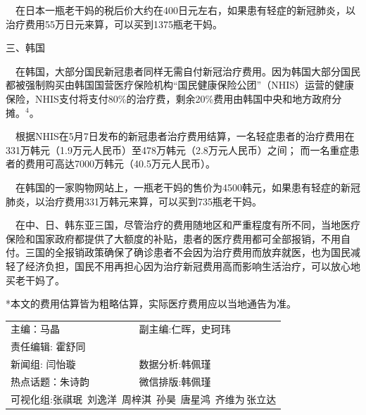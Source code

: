 \documentclass[
]{article}
\begin{document}
\(\quad\)在日本一瓶老干妈的税后价大约在400日元左右，如果患有轻症的新冠肺炎，以治疗费用55万日元来算，可以买到1375瓶老干妈。

三、韩国

\(\quad\)在韩国，大部分国民新冠患者同样无需自付新冠治疗费用。因为韩国大部分国民都被强制购买由韩国国营医疗保险机构``国民健康保险公团''（NHIS）运营的健康保险，NHIS支付将支付80\%的治疗费，剩余20\%费用由韩国中央和地方政府分摊。\(^4\)。

\(\quad\)根据NHIS在5月7日发布的新冠患者治疗费用结算，一名轻症患者的治疗费用在331万韩元（1.9万元人民币）至478万韩元（2.8万元人民币）之间；
而一名重症患者的费用可高达7000万韩元（40.5万元人民币）。

\(\quad\)在韩国的一家购物网站上，一瓶老干妈的售价为4500韩元，如果患有轻症的新冠肺炎，以治疗费用331万韩元来算，可以买到735瓶老干妈。

\(\quad\)在中、日、韩东亚三国，尽管治疗的费用随地区和严重程度有所不同，当地医疗保险和国家政府都提供了大额度的补贴，患者的医疗费用都可全部报销，不用自付。三国的全报销政策确保了确诊患者不会因为治疗费用而放弃就医，也为国民减轻了经济负担，国民不用再担心因为治疗新冠费用高而影响生活治疗，可以放心地买老干妈了。

*本文的费用估算皆为粗略估算，实际医疗费用应以当地通告为准。

\vspace{5mm}

\centering
\fontsize{12}{12}
\selectfont
\begin{tabular}{ll}


主编：马晶  &  副主编:仁晖，史珂玮 \\
责任编辑: 霍舒同  \\
新闻组: 闫怡璇 &  数据分析:韩佩瑾 \\
热点话题：朱诗韵 & 微信排版:韩佩瑾 \\
\multicolumn{2}{l}{可视化组:张祺珉\, 刘逸洋\, 周梓淇\, 孙昊\, 唐星鸿\, 齐维为\,张立达}

\end{tabular}
\end{document}
